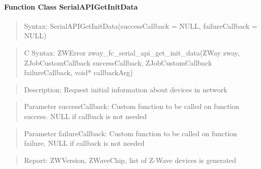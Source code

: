 \paragraph{Function Class SerialAPIGetInitData}
\begin{quote}Syntax: SerialAPIGetInitData(successCallback = NULL, failureCallback = NULL)\end{quote}
\begin{quote}C Syntax: ZWError zway\_fc\_serial\_api\_get\_init\_data(ZWay zway, ZJobCustomCallback successCallback, ZJobCustomCallback failureCallback, void* callbackArg)\end{quote}
\begin{quote}Description: Request initial information about devices in network\end{quote}
\begin{quote}Parameter successCallback: Custom function to be called on function success. NULL if callback is not needed\end{quote}
\begin{quote}Parameter failureCallback: Custom function to be called on function failure. NULL if callback is not needed\end{quote}
\begin{quote}Report: ZWVersion, ZWaveChip, list of Z-Wave devices is generated\end{quote}

